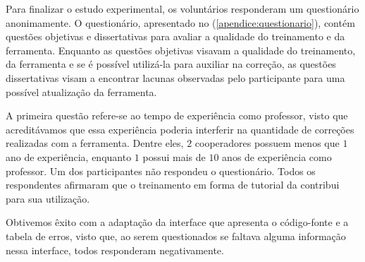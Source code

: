%		
%		
		
		Para finalizar o estudo experimental, os voluntários responderam um questionário
		anonimamente. O questionário, apresentado no (\cref{apendice:questionario}),
		contém questões
		objetivas e	dissertativas para avaliar a qualidade do treinamento e da ferramenta.
		Enquanto as questões objetivas visavam a qualidade do treinamento, da ferramenta e
		se é possível utilizá-la para auxiliar na correção, as questões dissertativas
		visam a encontrar lacunas observadas pelo participante para uma possível 
		atualização da ferramenta.
		
		A primeira questão refere-se ao tempo de experiência como professor,
		visto que acreditávamos que essa experiência poderia interferir na quantidade
		de correções realizadas com a ferramenta. Dentre eles, $2$ cooperadores possuem
		menos que $1$ ano de experiência, enquanto $1$ possui mais de $10$ anos de
		experiência como professor. Um dos participantes não respondeu o questionário.
		Todos os respondentes afirmaram que o treinamento em forma
		de tutorial da  contribui para sua utilização.
		
		Obtivemos êxito com a adaptação da interface que apresenta o código-fonte e a
		tabela de erros, visto que, ao serem questionados se faltava
		alguma informação nessa interface, todos responderam negativamente.
		
